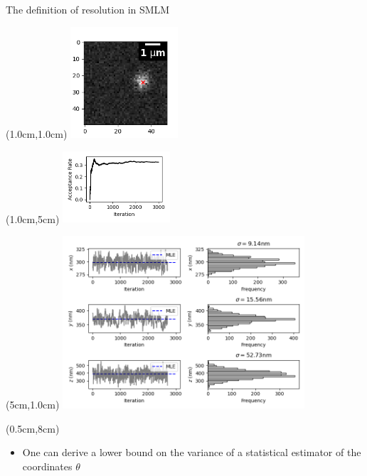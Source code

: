 \documentclass{beamer}					%
\begin{document}
\begin{frame}{The definition of resolution in SMLM}
\begin{textblock*}{4cm}(1.0cm,1.0cm)
\includegraphics[width=4cm]{MCMC/Figure_1.png}
\end{textblock*}
\begin{textblock*}{4cm}(1.0cm,5cm)
\includegraphics[width=4cm]{MCMC/Figure_2.png}
\end{textblock*}
\begin{textblock*}{9cm}(5cm,1.0cm)
\includegraphics[width=9cm]{MCMC/Figure_3.png}
\end{textblock*}
\begin{textblock*}{13cm}(0.5cm,8cm)
\begin{itemize}
\item One can derive a lower bound on the variance of a statistical estimator of the coordinates $\theta$
\end{itemize}
\end{textblock*}

\end{frame}
\end{document}
